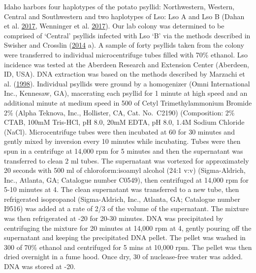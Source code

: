 \documentclass[]{article}
\begin{document}
Idaho harbors four haplotypes of the potato psyllid: Northwestern,
Western, Central and Southwestern and two haplotypes of Lso: Lso A and
Lso B (Dahan et al. \protect\hyperlink{ref-Dahan2017}{2017}, Wenninger
et al. \protect\hyperlink{ref-Wenninger2017}{2017}). Our lab colony was
determined to be comprised of `Central' psyllids infected with Lso `B'
via the methods described in Swisher and Crosslin
(\protect\hyperlink{ref-Swisher2014a}{2014} a). A sample of forty
psyllids taken from the colony were transferred to individual
microcentrifuge tubes filled with 70\% ethanol. Lso incidence was tested
at the Aberdeen Research and Extension Center (Aberdeen, ID, USA). DNA
extraction was based on the methods described by Marzachi et al.
(\protect\hyperlink{ref-Marzachi1998}{1998}). Individual psyllids were
ground by a homogenizer (Omni International Inc., Kennesaw, GA),
macerating each psyllid for 1 minute at high speed and an additional
minute at medium speed in 500 of Cetyl Trimethylammonium Bromide 2\%
(Alpha Teknova, Inc., Hollister, CA, Cat. No.~C2190) (Composition: 2\%
CTAB, 100mM Tris-HCl, pH 8.0, 20mM EDTA, pH 8.0, 1.4M Sodium Chloride
(NaCl). Microcentrifuge tubes were then incubated at 60 for 30 minutes
and gently mixed by inversion every 10 minutes while incubating. Tubes
were then spun in a centrifuge at 14,000 rpm for 5 minutes and then the
supernatant was transferred to clean 2 ml tubes. The supernatant was
vortexed for approximately 20 seconds with 500 ml of chloroform:isoamyl
alcohol (24:1 v:v) (Sigma-Aldrich, Inc., Atlanta, GA; Catalogue number
C0549), then centrifuged at 14,000 rpm for 5-10 minutes at 4. The clean
supernatant was transferred to a new tube, then refrigerated isopropanol
(Sigma-Aldrich, Inc., Atlanta, GA; Catalogue number I9516) was added at
a rate of 2/3 of the volume of the supernatant. The mixture was then
refrigerated at -20 for 20-30 minutes. DNA was precipitated by
centrifuging the mixture for 20 minutes at 14,000 rpm at 4, gently
pouring off the supernatant and keeping the precipitated DNA pellet. The
pellet was washed in 300 of 70\% ethanol and centrifuged for 5 mins at
10,000 rpm. The pellet was then dried overnight in a fume hood. Once
dry, 30 of nuclease-free water was added. DNA was stored at -20.
\end{document}
